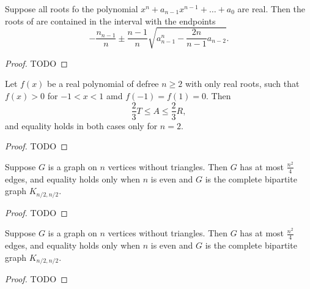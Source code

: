 \begin{theorem}
  \label{ch20theorem1}
  Suppose all roots fo the polynomial
  $x^n + a_{n - 1}x^{n - 1} + \dots +a_0$ are real.
  Then the roots of are contained in the interval with the endpoints
  \[
  -\frac{n_{n-1}}{n}\pm\frac{n - 1}{n}\sqrt{a^n_{n - 1} - \frac{2n}{n - 1}a_{n - 2}}.
  \]
\end{theorem}
\begin{proof}
  TODO
\end{proof}



\begin{theorem}
  \label{ch20theorem2} Let $f(x)$ be a real polynomial of defree $n \ge 2$ with only real
  roots, such that $f(x)> 0$ for $ -1 < x < 1$ amd $f(-1) = f(1) = 0$. Then
  \[
  \frac{2}{3}T \le A \le \frac{2}{3}R,
  \]
  and equality holds in both cases only for $n=2$.
\end{theorem}
\begin{proof}
  TODO
\end{proof}

\begin{theorem}
  \label{ch20theorem3proof1}
  Suppose $G$ is a graph on $n$ vertices without triangles. Then $G$
  has at most $\frac{n^2}{4}$ edges, and equality holds only when $n$ is even and $G$ is the
  complete bipartite graph $K_{n/2, n/2}$.
\end{theorem}
\begin{proof}
  TODO
\end{proof}

\begin{theorem}
  \label{ch20theorem3proof2}
  Suppose $G$ is a graph on $n$ vertices without triangles. Then $G$
  has at most $\frac{n^2}{4}$ edges, and equality holds only when $n$ is even and $G$ is the
  complete bipartite graph $K_{n/2, n/2}$.
\end{theorem}
\begin{proof}
  TODO
\end{proof}
